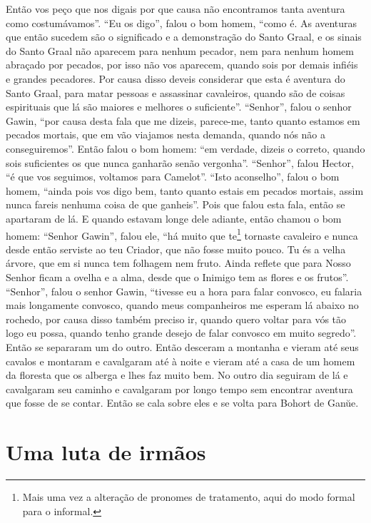 Então vos peço que nos digais por que causa não encontramos tanta aventura como
costumávamos”. “Eu os digo”, falou o bom homem, “como é. As aventuras que então
sucedem são o significado e a demonstração do Santo Graal, e os sinais do Santo
Graal não aparecem para nenhum pecador, nem para nenhum homem abraçado por
pecados, por isso não vos aparecem, quando sois por demais infiéis e grandes
pecadores. Por causa disso deveis considerar que esta é aventura do Santo
Graal, para matar pessoas e assassinar cavaleiros, quando são de coisas
espirituais que lá são maiores e melhores o suficiente”. “Senhor”,
falou o senhor Gawin, “por causa desta fala que me dizeis, parece-me, tanto
quanto estamos em pecados mortais, que em vão viajamos nesta demanda, quando
nós não a conseguiremos”. Então falou o bom homem: “em verdade, dizeis o
correto, quando sois suficientes os que nunca ganharão senão vergonha”.
“Senhor”, falou Hector, “é que vos seguimos, voltamos para Camelot”. “Isto
aconselho”, falou o bom homem, “ainda pois vos digo bem,  tanto quanto estais
em pecados mortais, assim nunca fareis nenhuma coisa de que ganheis”. Pois que
falou esta fala, então se apartaram de lá. E quando estavam longe dele adiante,
então chamou o bom homem: “Senhor Gawin”, falou ele, “há muito que te\footnote{
Mais uma vez a alteração de pronomes de tratamento, aqui do modo formal para o
informal.}  tornaste cavaleiro e nunca desde então serviste ao teu
Criador, que não fosse muito pouco. Tu és a velha árvore, que em si nunca tem
folhagem nem fruto. Ainda reflete que para Nosso Senhor ficam a ovelha e a
alma, desde que o Inimigo tem as flores e os frutos”. “Senhor”, falou
o senhor Gawin, “tivesse eu a hora para falar convosco, eu falaria mais
longamente convosco, quando meus companheiros me esperam lá abaixo no rochedo,
por causa disso também preciso ir, quando quero voltar para vós tão logo eu
possa, quando tenho grande desejo de falar convosco em muito segredo”. Então se
separaram um do outro. Então desceram a montanha e vieram até seus cavalos e
montaram e cavalgaram até à noite e vieram até a casa de um homem da floresta
que os alberga e lhes faz muito bem. No outro dia seguiram de lá e cavalgaram
seu caminho e cavalgaram por longo tempo sem encontrar aventura que fosse de se
contar. Então se cala sobre eles e se volta para Bohort de Gan\u{u}e. 

\chapter{Uma luta de irmãos}

